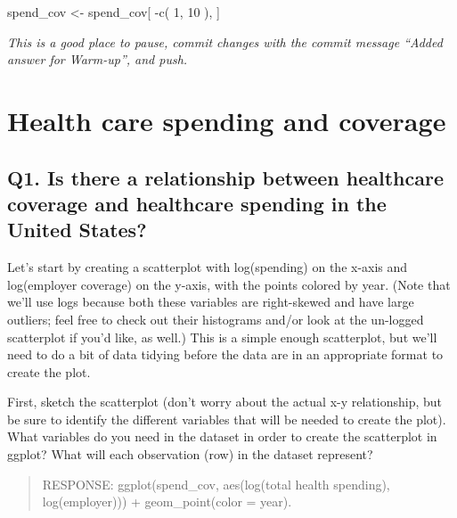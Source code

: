 \documentclass[
]{article}
\newenvironment{Shaded}{\begin{snugshade}}{\end{snugshade}}
\newcommand{\DecValTok}[1]{\textcolor[rgb]{0.00,0.00,0.81}{#1}}
\newcommand{\FunctionTok}[1]{\textcolor[rgb]{0.00,0.00,0.00}{#1}}
\newcommand{\NormalTok}[1]{#1}
\newcommand{\OtherTok}[1]{\textcolor[rgb]{0.56,0.35,0.01}{#1}}
\newcommand{\SpecialCharTok}[1]{\textcolor[rgb]{0.00,0.00,0.00}{#1}}
\begin{document}
\begin{Shaded}
\begin{Highlighting}[]
\NormalTok{spend\_cov }\OtherTok{\textless{}{-}}\NormalTok{ spend\_cov[ }\SpecialCharTok{{-}}\FunctionTok{c}\NormalTok{( }\DecValTok{1}\NormalTok{, }\DecValTok{10}\NormalTok{ ), ] }
\end{Highlighting}
\end{Shaded}

\emph{This is a good place to pause, commit changes with the commit
message ``Added answer for Warm-up'', and push.}

\hypertarget{health-care-spending-and-coverage}{%
\section{Health care spending and
coverage}\label{health-care-spending-and-coverage}}

\hypertarget{q1.-is-there-a-relationship-between-healthcare-coverage-and-healthcare-spending-in-the-united-states}{%
\subsection{Q1. Is there a relationship between healthcare coverage and
healthcare spending in the United
States?}\label{q1.-is-there-a-relationship-between-healthcare-coverage-and-healthcare-spending-in-the-united-states}}

Let's start by creating a scatterplot with log(spending) on the x-axis
and log(employer coverage) on the y-axis, with the points colored by
year. (Note that we'll use logs because both these variables are
right-skewed and have large outliers; feel free to check out their
histograms and/or look at the un-logged scatterplot if you'd like, as
well.) This is a simple enough scatterplot, but we'll need to do a bit
of data tidying before the data are in an appropriate format to create
the plot.

First, sketch the scatterplot (don't worry about the actual x-y
relationship, but be sure to identify the different variables that will
be needed to create the plot). What variables do you need in the dataset
in order to create the scatterplot in ggplot? What will each observation
(row) in the dataset represent?

\begin{quote}
RESPONSE: ggplot(spend\_cov, aes(log(total health spending),
log(employer))) + geom\_point(color = year).
\end{quote}
\end{document}
